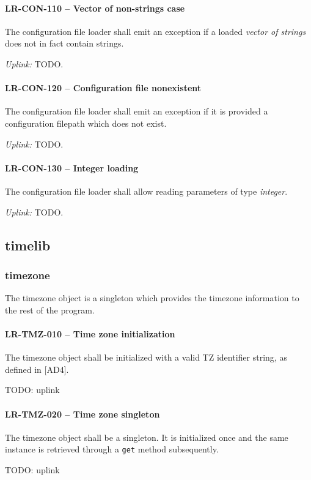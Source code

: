 \paragraph{LR-CON-110 -- Vector of non-strings case}
The configuration file loader shall emit an exception if a loaded
\emph{vector of strings} does not in fact contain strings.

\textit{Uplink: } TODO.

\paragraph{LR-CON-120 -- Configuration file nonexistent}
The configuration file loader shall emit an exception if it is provided
a configuration filepath which does not exist.

\textit{Uplink: } TODO.

\paragraph{LR-CON-130 -- Integer loading}
The configuration file loader shall allow reading parameters of type
\emph{integer}.

\textit{Uplink: } TODO.

\subsection{time\textunderscore lib}
\subsubsection{time\textunderscore zone}
The time\textunderscore zone object is a singleton which provides the
timezone information to the rest of the program.

\paragraph{LR-TMZ-010 -- Time zone initialization}
The timezone object shall be initialized with a valid TZ identifier string,
as defined in [AD4].

TODO: uplink
\paragraph{LR-TMZ-020 -- Time zone singleton}
The timezone object shall be a singleton. It is initialized once and the same
instance is retrieved through a \lstinline{get} method subsequently.

TODO: uplink
